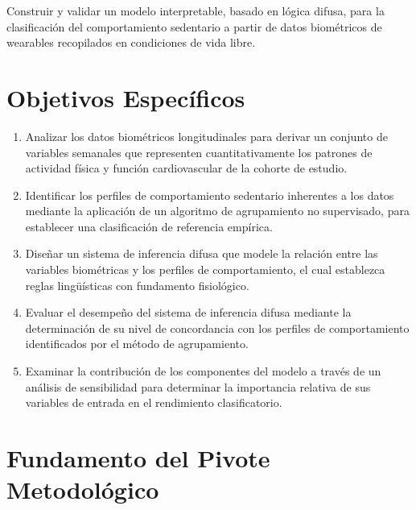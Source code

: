 Construir y validar un modelo interpretable, basado en lógica difusa, para la clasificación del comportamiento sedentario a partir de datos biométricos de wearables recopilados en condiciones de vida libre.

\section{Objetivos Específicos}
\label{sec:objetivos_especificos}

\begin{enumerate}
    \item Analizar los datos biométricos longitudinales para derivar un conjunto de variables semanales que representen cuantitativamente los patrones de actividad física y función cardiovascular de la cohorte de estudio.
    
    \item Identificar los perfiles de comportamiento sedentario inherentes a los datos mediante la aplicación de un algoritmo de agrupamiento no supervisado, para establecer una clasificación de referencia empírica.
    
    \item Diseñar un sistema de inferencia difusa que modele la relación entre las variables biométricas y los perfiles de comportamiento, el cual establezca reglas lingüísticas con fundamento fisiológico.
    
    \item Evaluar el desempeño del sistema de inferencia difusa mediante la determinación de su nivel de concordancia con los perfiles de comportamiento identificados por el método de agrupamiento.
    
    \item Examinar la contribución de los componentes del modelo a través de un análisis de sensibilidad para determinar la importancia relativa de sus variables de entrada en el rendimiento clasificatorio.
\end{enumerate}

\section{Fundamento del Pivote Metodológico}
\label{sec:fundamento_pivote}

